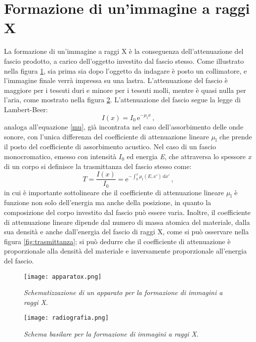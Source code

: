 \documentclass{report}
\newcommand{\figref}[1]{figura \ref{#1}}
\renewcommand{\eqref}[1]{equazione \ref{#1}}
\numberwithin{equation}{section}
\numberwithin{figure}{section}
\begin{document}
\section{Formazione di un'immagine a raggi X}\label{4.2}
La formazione di un'immagine a raggi X è la conseguenza dell'attenuazione del fascio prodotto, a carico dell'oggetto investito dal fascio stesso. Come illustrato nella \figref{fig:apparatox}, sia prima sia dopo l'oggetto da indagare è posto un collimatore, e l'immagine finale verrà impressa su una lastra. L'attenuazione del fascio è maggiore per i tessuti duri e minore per i tessuti molli, mentre è quasi nulla per l'aria, come mostrato nella \figref{fig:radiografia}. L'attenuazione del fascio segue la legge di Lambert-Beer:
\begin{equation}\label{lambert}
    I(x) = I_0\,\mathrm{e}^{-\mu_\mathrm{l}x}\,,
\end{equation}
analoga all'\eqref{mu}, già incontrata nel caso dell'assorbimento delle onde sonore, con l'unica differenza del coefficiente di attenuazione lineare $\mu_\mathrm{l}$ che prende il posto del coefficiente di assorbimento acustico. Nel caso di un fascio monocromatico, emesso con intensità $I_0$ ed energia \textit{E}, che attraversa lo spessore \textit{x} di un corpo si definisce la trasmittanza del fascio stesso come:
\begin{equation}
    T = \frac{I(x)}{I_0} = \mathrm{e}^{-\int_0^x \mu_\mathrm{l}(E,x')\,\mathrm{d}x'}\,,
\end{equation}
in cui è importante sottolineare che il coefficiente di attenuazione lineare $\mu_\mathrm{l}$ è funzione non solo dell'energia ma anche della posizione, in quanto la composizione del corpo investito dal fascio può essere varia. Inoltre, il coefficiente di attenuazione lineare dipende dal numero di massa atomica del materiale, dalla sua densità e anche dall'energia del fascio di raggi X, come si può osservare nella \figref{fig:trasmittanza}; si può dedurre che il coefficiente di attenuazione è proporzionale alla densità del materiale e inversamente proporzionale all'energia del fascio.

\begin{figure}[htp]
\centering
\texttt{[image: apparatox.png]}
\caption{\label{fig:apparatox} \textit{Schematizzazione di un apparato per la formazione di immagini a raggi X}.}
\end{figure}

\begin{figure}[htp]
\centering
\texttt{[image: radiografia.png]}
\caption{\label{fig:radiografia} \textit{Schema basilare per la formazione di immagini a raggi X}.}
\end{figure}
\end{document}
